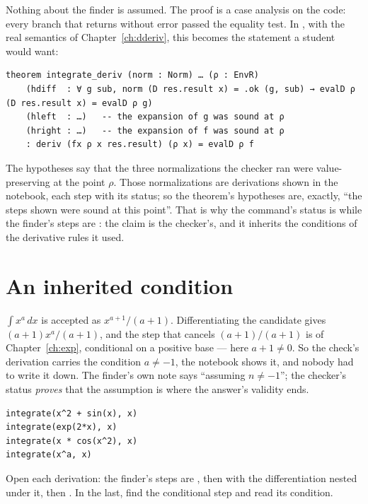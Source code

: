 Nothing about the finder is assumed. The proof is a case analysis on the code: every branch that
returns without error passed the equality test. In , with the real semantics of
Chapter~\ref{ch:dderiv}, this becomes the statement a student would want:

\begin{verbatim}
theorem integrate_deriv (norm : Norm) … (ρ : EnvR)
    (hdiff  : ∀ g sub, norm (D res.result x) = .ok (g, sub) → evalD ρ (D res.result x) = evalD ρ g)
    (hleft  : …)   -- the expansion of g was sound at ρ
    (hright : …)   -- the expansion of f was sound at ρ
    : deriv (fx ρ x res.result) (ρ x) = evalD ρ f
\end{verbatim}

The hypotheses say that the three normalizations the checker ran were value-preserving at the
point $\rho$. Those normalizations are derivations shown in the notebook, each step with its
status; so the theorem's hypotheses are, exactly, ``the steps shown were sound at this point''.
That is why the command's status is  while the finder's steps are
: the claim is the checker's, and it inherits the conditions of the derivative
rules it used.

\section{An inherited condition}

$\int x^a\,dx$ is accepted as $x^{a+1}/(a+1)$. Differentiating the candidate gives
$(a+1)x^a/(a+1)$, and the step that cancels $(a+1)/(a+1)$ is  of
Chapter~\ref{ch:exp}, conditional on a positive base --- here $a + 1 \neq 0$. So the check's
derivation carries the condition $a \neq -1$, the notebook shows it, and nobody had to write it
down. The finder's own note says ``assuming $n \neq -1$''; the checker's status \emph{proves} that
the assumption is where the answer's validity ends.

\begin{trybox}
\begin{verbatim}
integrate(x^2 + sin(x), x)
integrate(exp(2*x), x)
integrate(x * cos(x^2), x)
integrate(x^a, x)
\end{verbatim}
  Open each derivation: the finder's steps are , then  with the
  differentiation nested under it, then . In the last, find the conditional
  step and read its condition.
\end{trybox}

